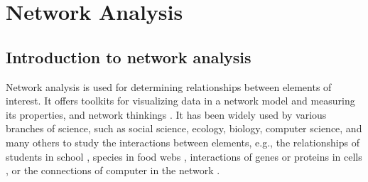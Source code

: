 \section*{Network Analysis}
\subsection*{Introduction to network analysis}
Network analysis is used for determining relationships between elements of interest. It offers toolkits for visualizing data in a network model and measuring its properties, and network thinkings \citep{PROULX:2005hx}. It has been widely used by various branches of science, such as social science, ecology, biology, computer science, and many others to study the interactions between elements, e.g., the relationships of students in school \citep{moody2001race}, species in food webs \citep{krause2003compartments}, interactions of genes or proteins in cells \citep{guimera2005functional}, or the connections of computer in the network \citep{pastor2001epidemic, newman2006modularity}.

